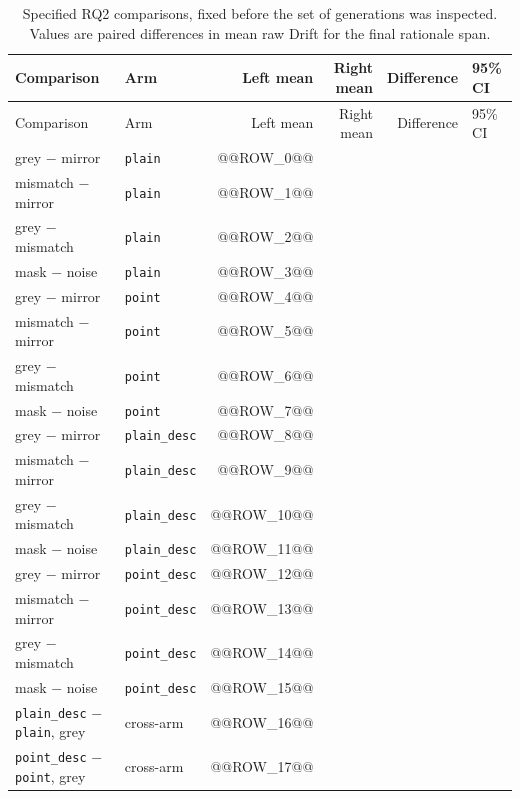 \begin{longtable}{L{3.9cm}lrrrL{3.0cm}}
\caption[Planned RQ2 comparisons]{Specified RQ2 comparisons, fixed before the
set of generations was inspected. Values are paired differences in
mean raw Drift for the final rationale span.}\label{tab:app-rq2-contrasts}\\
\toprule
Comparison & Arm & Left mean & Right mean & Difference & 95\% CI \\
\midrule
\endfirsthead
\toprule
Comparison & Arm & Left mean & Right mean & Difference & 95\% CI \\
\midrule
\endhead
grey $-$ mirror & \texttt{plain} & @@ROW_0@@ \\
mismatch $-$ mirror & \texttt{plain} & @@ROW_1@@ \\
grey $-$ mismatch & \texttt{plain} & @@ROW_2@@ \\
mask $-$ noise & \texttt{plain} & @@ROW_3@@ \\
grey $-$ mirror & \texttt{point} & @@ROW_4@@ \\
mismatch $-$ mirror & \texttt{point} & @@ROW_5@@ \\
grey $-$ mismatch & \texttt{point} & @@ROW_6@@ \\
mask $-$ noise & \texttt{point} & @@ROW_7@@ \\
grey $-$ mirror & \texttt{plain\_desc} & @@ROW_8@@ \\
mismatch $-$ mirror & \texttt{plain\_desc} & @@ROW_9@@ \\
grey $-$ mismatch & \texttt{plain\_desc} & @@ROW_10@@ \\
mask $-$ noise & \texttt{plain\_desc} & @@ROW_11@@ \\
grey $-$ mirror & \texttt{point\_desc} & @@ROW_12@@ \\
mismatch $-$ mirror & \texttt{point\_desc} & @@ROW_13@@ \\
grey $-$ mismatch & \texttt{point\_desc} & @@ROW_14@@ \\
mask $-$ noise & \texttt{point\_desc} & @@ROW_15@@ \\
\texttt{plain\_desc} $-$ \texttt{plain}, grey & cross-arm & @@ROW_16@@ \\
\texttt{point\_desc} $-$ \texttt{point}, grey & cross-arm & @@ROW_17@@ \\
\bottomrule
\end{longtable}
